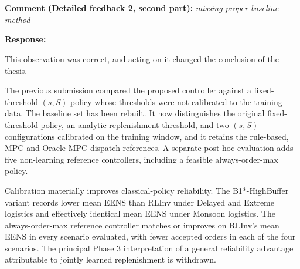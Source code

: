 \section{}
\label{sec:rebuttal_baselines}

\noindent\textbf{Comment (Detailed feedback 2, second part):} \textit{missing
proper baseline method}

\vspace{\baselineskip}

\noindent\textbf{Response:}

This observation was correct, and acting on it changed the conclusion of the
thesis.

The previous submission compared the proposed controller against a
fixed-threshold $(s,S)$ policy whose thresholds were not calibrated to the
training data. The baseline set has been rebuilt. It now distinguishes the
original fixed-threshold policy, an analytic replenishment threshold, and two
$(s,S)$ configurations calibrated on the training window, and it retains the
rule-based, MPC and Oracle-MPC dispatch references. A separate post-hoc
evaluation adds five non-learning reference controllers, including a feasible
always-order-max policy.

Calibration materially improves classical-policy reliability. The
B1*-HighBuffer variant records lower mean EENS than RLInv under Delayed and
Extreme logistics and effectively identical mean EENS under Monsoon logistics.
The always-order-max reference controller matches or improves on RLInv's
mean EENS in every scenario evaluated, with fewer accepted orders in each of
the four scenarios.
The principal Phase 3 interpretation of a general reliability advantage
attributable to jointly learned replenishment is withdrawn.

